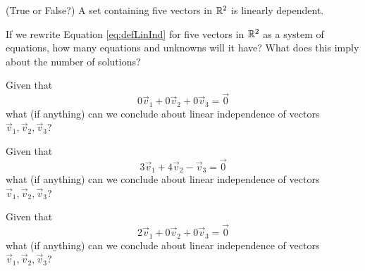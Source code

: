 \documentclass{ximera}
\begin{document}
\begin{problem}\label{prob:TFlinind2}
(True or False?) A set containing five vectors in $\mathbb{R}^2$ is linearly dependent.
\begin{multipleChoice}
 \end{multipleChoice}
  \begin{hint}
 If we rewrite Equation \ref{eq:defLinInd} for five vectors in $\mathbb{R}^2$ as a system of equations, how many equations and unknowns will it have?  What does this imply about the number of solutions?
 \end{hint}
\end{problem}


\begin{problem}\label{prob:linindmultchoice5}
Given that
$$0\vec{v}_1+ 0\vec{v}_2+ 0\vec{v}_3=\vec{0}$$
what (if anything) can we conclude about linear independence of vectors $\vec{v}_1, \vec{v}_2, \vec{v}_3$?
\begin{multipleChoice}
 \end{multipleChoice}
\end{problem}

\begin{problem}\label{prob:linindmultchoice6}
Given that
$$3\vec{v}_1+ 4\vec{v}_2- \vec{v}_3=\vec{0}$$
what (if anything) can we conclude about linear independence of vectors $\vec{v}_1, \vec{v}_2, \vec{v}_3$?
\begin{multipleChoice}
 \end{multipleChoice}
\end{problem}

\begin{problem}\label{prob:linindmultchoice7}
Given that
$$2\vec{v}_1+ 0\vec{v}_2+ 0\vec{v}_3=\vec{0}$$
what (if anything) can we conclude about linear independence of vectors $\vec{v}_1, \vec{v}_2, \vec{v}_3$?
\begin{multipleChoice}
 \end{multipleChoice}
\end{problem}
\end{document}
